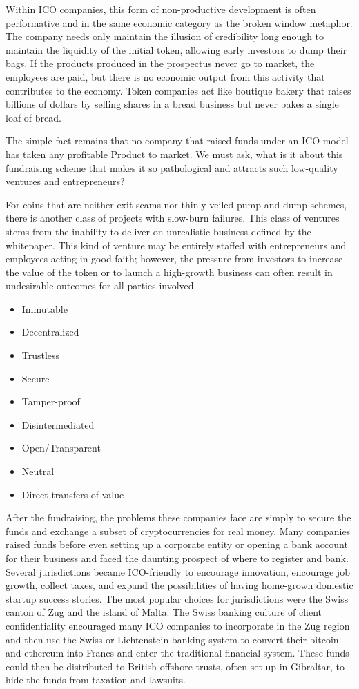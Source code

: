 
Within ICO companies, this form of non-productive development is often
performative and in the same economic category as the broken window metaphor.
The company needs only maintain the illusion of credibility long enough to
maintain the liquidity of the initial token, allowing early investors to dump
their bags. If the products produced in the prospectus never go to market, the
employees are paid, but there is no economic output from this activity that
contributes to the economy. Token companies act like boutique bakery that raises
billions of dollars by selling shares in a bread business but never bakes a
single loaf of bread.

The simple fact remains that no company that raised funds under an ICO model has
taken any profitable Product to market. We must ask, what is it about this
fundraising scheme that makes it so pathological and attracts such low-quality
ventures and entrepreneurs?

For coins that are neither exit scams nor thinly-veiled pump and dump schemes,
there is another class of projects with slow-burn failures. This class of
ventures stems from the inability to deliver on unrealistic business defined by
the whitepaper. This kind of venture may be entirely staffed with entrepreneurs
and employees acting in good faith; however, the pressure from investors to
increase the value of the token or to launch a high-growth business can often
result in undesirable outcomes for all parties involved.

\begin{itemize}
\item Immutable
\item Decentralized
\item Trustless
\item Secure
\item Tamper-proof
\item Disintermediated
\item Open/Transparent
\item Neutral
\item Direct transfers of value
\end{itemize}

After the fundraising, the problems these companies face are simply to secure
the funds and exchange a subset of cryptocurrencies for real money. Many
companies raised funds before even setting up a corporate entity or opening a
bank account for their business and faced the daunting prospect of where to
register and bank. Several jurisdictions became ICO-friendly to encourage
innovation, encourage job growth, collect taxes, and expand the possibilities of
having home-grown domestic startup success stories. The most popular choices for
jurisdictions were the Swiss canton of Zug and the island of Malta. The Swiss
banking culture of client confidentiality encouraged many ICO companies to
incorporate in the Zug region and then use the Swiss or Lichtenstein banking
system to convert their bitcoin and ethereum into Francs and enter the
traditional financial system. These funds could then be distributed to British
offshore trusts, often set up in Gibraltar, to hide the funds from taxation and
lawsuits.

